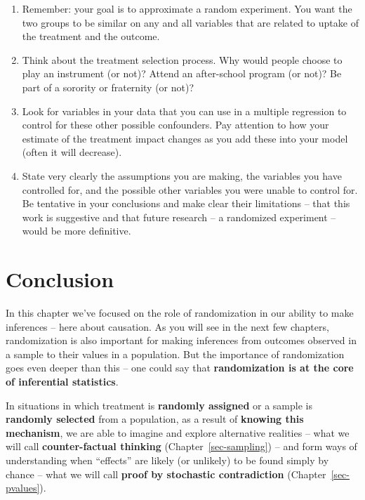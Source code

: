 \documentclass[
  letterpaper,
  DIV=11,
  numbers=noendperiod]{scrreprt}
\providecommand{\tightlist}{%
  \setlength{\itemsep}{0pt}\setlength{\parskip}{0pt}}\usepackage{longtable,booktabs,array}
\theoremstyle{definition}
\theoremstyle{remark}
\begin{document}
\begin{enumerate}
\def\labelenumi{\arabic{enumi}.}
\tightlist
\item
  Remember: your goal is to approximate a random experiment. You want
  the two groups to be similar on any and all variables that are related
  to uptake of the treatment and the outcome.
\item
  Think about the treatment selection process. Why would people choose
  to play an instrument (or not)? Attend an after-school program (or
  not)? Be part of a sorority or fraternity (or not)?
\item
  Look for variables in your data that you can use in a multiple
  regression to control for these other possible confounders. Pay
  attention to how your estimate of the treatment impact changes as you
  add these into your model (often it will decrease).
\item
  State very clearly the assumptions you are making, the variables you
  have controlled for, and the possible other variables you were unable
  to control for. Be tentative in your conclusions and make clear their
  limitations -- that this work is suggestive and that future research
  -- a randomized experiment -- would be more definitive.
\end{enumerate}

\hypertarget{sec-causality-conclusion}{%
\section{Conclusion}\label{sec-causality-conclusion}}

In this chapter we've focused on the role of randomization in our
ability to make inferences -- here about causation. As you will see in
the next few chapters, randomization is also important for making
inferences from outcomes observed in a sample to their values in a
population. But the importance of randomization goes even deeper than
this -- one could say that \textbf{randomization is at the core of
inferential statistics}.

In situations in which treatment is \textbf{randomly assigned} or a
sample is \textbf{randomly selected} from a population, as a result of
\textbf{knowing this mechanism}, we are able to imagine and explore
alternative realities -- what we will call \textbf{counter-factual
thinking} (Chapter~\ref{sec-sampling}) -- and form ways of understanding
when ``effects'' are likely (or unlikely) to be found simply by chance
-- what we will call \textbf{proof by stochastic contradiction}
(Chapter~\ref{sec-pvalues}).
\end{document}
